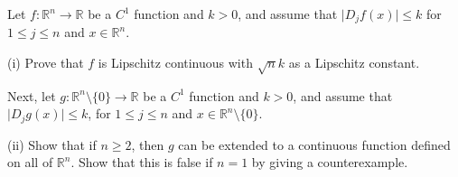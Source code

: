 \begin{solution}
\end{solution}

\begin{exercise}{15}
    Let $f: \mathbb{R}^n \rightarrow \mathbb{R}$ be a $C^1$ function and $k > 0$, and assume that $\lvert D_jf(x) \rvert \leq k$ for $1 \leq j \leq n$ and $x \in \mathbb{R}^n$.

    (i) Prove that $f$ is Lipschitz continuous with $\sqrt{n}k$ as a Lipschitz constant.

    Next, let $g: \mathbb{R}^n \setminus \{0\} \rightarrow \mathbb{R}$ be a $C^1$ function and $k > 0$, and assume that $\lvert D_j g(x) \rvert \leq k$, for $1 \leq j \leq n$ and $x \in \mathbb{R}^n \setminus \{0\}$.

    (ii) Show that if $n \geq 2$, then $g$ can be extended to a continuous function defined on all of $\mathbb{R}^n$.
    Show that this is false if $n = 1$ by giving a counterexample.
\end{exercise}

